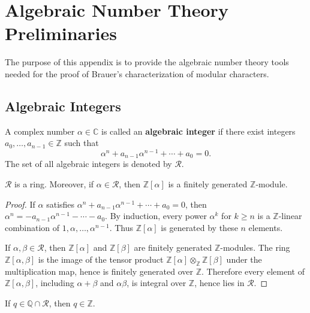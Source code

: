 

\chapter{Algebraic Number Theory Preliminaries}
The purpose of this appendix is to provide the algebraic number theory tools needed for the proof of Brauer's characterization of modular characters.

\section{Algebraic Integers}

\begin{defn}
A complex number \(\alpha \in \mathbb{C}\) is called an \textbf{algebraic integer} if there exist integers \(a_0, \dots, a_{n-1} \in \mathbb{Z}\) such that
\[
\alpha^n + a_{n-1}\alpha^{n-1} + \cdots + a_0 = 0.
\]
The set of all algebraic integers is denoted by \(\mathcal{R}\).
\end{defn}

\begin{prop}
\(\mathcal{R}\) is a ring. Moreover, if \(\alpha \in \mathcal{R}\), then \(\mathbb{Z}[\alpha]\) is a finitely generated \(\mathbb{Z}\)-module.
\end{prop}

\begin{proof}
If \(\alpha\) satisfies \(\alpha^n + a_{n-1}\alpha^{n-1} + \cdots + a_0 = 0\), then \(\alpha^n = -a_{n-1}\alpha^{n-1} - \cdots - a_0\). By induction, every power \(\alpha^k\) for \(k \ge n\) is a \(\mathbb{Z}\)-linear combination of \(1, \alpha, \dots, \alpha^{n-1}\). Thus \(\mathbb{Z}[\alpha]\) is generated by these \(n\) elements.

If \(\alpha, \beta \in \mathcal{R}\), then \(\mathbb{Z}[\alpha]\) and \(\mathbb{Z}[\beta]\) are finitely generated \(\mathbb{Z}\)-modules. The ring \(\mathbb{Z}[\alpha, \beta]\) is the image of the tensor product \(\mathbb{Z}[\alpha] \otimes_{\mathbb{Z}} \mathbb{Z}[\beta]\) under the multiplication map, hence is finitely generated over \(\mathbb{Z}\). Therefore every element of \(\mathbb{Z}[\alpha, \beta]\), including \(\alpha+\beta\) and \(\alpha\beta\), is integral over \(\mathbb{Z}\), hence lies in \(\mathcal{R}\).
\end{proof}

\begin{prop}\label{prop:integer}
If \(q \in \mathbb{Q} \cap \mathcal{R}\), then \(q \in \mathbb{Z}\).
\end{prop}

